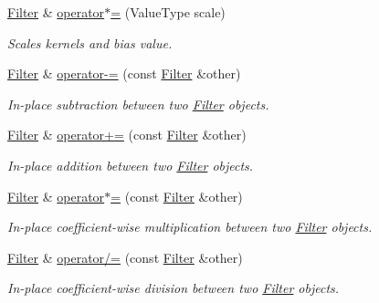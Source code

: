\begin{DoxyCompactItemize}
\item 
\hyperlink{structffnn_1_1layer_1_1convolution_1_1_filter}{Filter} \& \hyperlink{structffnn_1_1layer_1_1convolution_1_1_filter_a266f401f904688abe76239cd6563dd3c}{operator$\ast$=} (Value\-Type scale)
\begin{DoxyCompactList}\small\item\em Scales kernels and bias value. \end{DoxyCompactList}\item 
\hyperlink{structffnn_1_1layer_1_1convolution_1_1_filter}{Filter} \& \hyperlink{structffnn_1_1layer_1_1convolution_1_1_filter_ad25eed8e7ffa78ff50fb3318cef81de5}{operator-\/=} (const \hyperlink{structffnn_1_1layer_1_1convolution_1_1_filter}{Filter} \&other)
\begin{DoxyCompactList}\small\item\em In-\/place subtraction between two \hyperlink{structffnn_1_1layer_1_1convolution_1_1_filter}{Filter} objects. \end{DoxyCompactList}\item 
\hyperlink{structffnn_1_1layer_1_1convolution_1_1_filter}{Filter} \& \hyperlink{structffnn_1_1layer_1_1convolution_1_1_filter_a49da4098c5d9a8e400a248a564c84ec1}{operator+=} (const \hyperlink{structffnn_1_1layer_1_1convolution_1_1_filter}{Filter} \&other)
\begin{DoxyCompactList}\small\item\em In-\/place addition between two \hyperlink{structffnn_1_1layer_1_1convolution_1_1_filter}{Filter} objects. \end{DoxyCompactList}\item 
\hyperlink{structffnn_1_1layer_1_1convolution_1_1_filter}{Filter} \& \hyperlink{structffnn_1_1layer_1_1convolution_1_1_filter_aaaa1e310acdc9ab2372109b827d4edaa}{operator$\ast$=} (const \hyperlink{structffnn_1_1layer_1_1convolution_1_1_filter}{Filter} \&other)
\begin{DoxyCompactList}\small\item\em In-\/place coefficient-\/wise multiplication between two \hyperlink{structffnn_1_1layer_1_1convolution_1_1_filter}{Filter} objects. \end{DoxyCompactList}\item 
\hyperlink{structffnn_1_1layer_1_1convolution_1_1_filter}{Filter} \& \hyperlink{structffnn_1_1layer_1_1convolution_1_1_filter_afa3ec94a3919f5e844182e991ef972fc}{operator/=} (const \hyperlink{structffnn_1_1layer_1_1convolution_1_1_filter}{Filter} \&other)
\begin{DoxyCompactList}\small\item\em In-\/place coefficient-\/wise division between two \hyperlink{structffnn_1_1layer_1_1convolution_1_1_filter}{Filter} objects. \end{DoxyCompactList}\item 

\end{DoxyCompactItemize}
